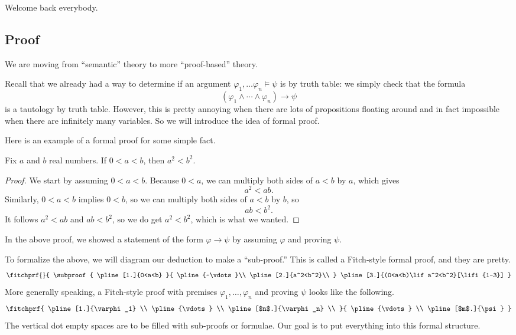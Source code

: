 
Welcome back everybody.

\subsection{Proof}
We are moving from ``semantic'' theory to more ``proof-based'' theory.

Recall that we already had a way to determine if an argument $\varphi_1,\ldots\varphi_n\models\psi$ is by truth table: we simply check that the formula
\[(\varphi_1\land\cdots\land\varphi_n)\to\psi\]
is a tautology by truth table. However, this is pretty annoying when there are lots of propositions floating around and in fact impossible when there are infinitely many variables. So we will introduce the idea of formal proof.

Here is an example of a formal proof for some simple fact.
\begin{prop}
	Fix $a$ and $b$ real numbers. If $0<a<b$, then $a^2<b^2$.
\end{prop}
\begin{proof}
	We start by assuming $0<a<b$. Because $0<a$, we can multiply both sides of $a<b$ by $a$, which gives
	\[a^2<ab.\]
	Similarly, $0<a<b$ implies $0<b$, so we can multiply both sides of $a<b$ by $b$, so
	\[ab<b^2.\]
	It follows $a^2<ab$ and $ab<b^2$, so we do get $a^2<b^2$, which is what we wanted.
\end{proof}
\begin{remark}
	In the above proof, we showed a statement of the form $\varphi\to\psi$ by assuming $\varphi$ and proving $\psi$.
\end{remark}
To formalize the above, we will diagram our deduction to make a ``sub-proof.'' This is called a Fitch-style formal proof, and they are pretty.
\[
	\fitchprf{} {
		\subproof{ \pline[1.]{0<a<b} }{
			\pline{~\vdots}\\
			\pline[2.]{a^2<b^2}\\
		}
		\pline[3.]{(0<a<b)\lif a^2<b^2}[\lifi{1--3}]
	}
\]
More generally speaking, a Fitch-style proof with premises $\varphi_1,\ldots,\varphi_n$ and proving $\psi$ looks like the following.
\[
	\fitchprf
	{
		\pline[1.]{\varphi_1} \\
		\pline{\vdots} \\
		\pline[$n$.]{\varphi_n} \\
	}
	{
		\pline{\vdots} \\
		\pline[$m$.]{\psi}
	}
\]
The vertical dot empty spaces are to be filled with sub-proofs or formulae. Our goal is to put everything into this formal structure.

